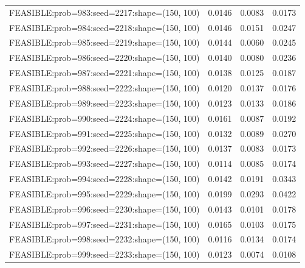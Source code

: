 \begin{longtable}{lccc}
FEASIBLE:prob=983:seed=2217:shape=(150, 100) &   0.0146 & 0.0083 & 0.0173 \\
FEASIBLE:prob=984:seed=2218:shape=(150, 100) &   0.0146 & 0.0151 & 0.0247 \\
FEASIBLE:prob=985:seed=2219:shape=(150, 100) &   0.0144 & 0.0060 & 0.0245 \\
FEASIBLE:prob=986:seed=2220:shape=(150, 100) &   0.0140 & 0.0080 & 0.0236 \\
FEASIBLE:prob=987:seed=2221:shape=(150, 100) &   0.0138 & 0.0125 & 0.0187 \\
FEASIBLE:prob=988:seed=2222:shape=(150, 100) &   0.0120 & 0.0137 & 0.0176 \\
FEASIBLE:prob=989:seed=2223:shape=(150, 100) &   0.0123 & 0.0133 & 0.0186 \\
FEASIBLE:prob=990:seed=2224:shape=(150, 100) &   0.0161 & 0.0087 & 0.0192 \\
FEASIBLE:prob=991:seed=2225:shape=(150, 100) &   0.0132 & 0.0089 & 0.0270 \\
FEASIBLE:prob=992:seed=2226:shape=(150, 100) &   0.0137 & 0.0083 & 0.0173 \\
FEASIBLE:prob=993:seed=2227:shape=(150, 100) &   0.0114 & 0.0085 & 0.0174 \\
FEASIBLE:prob=994:seed=2228:shape=(150, 100) &   0.0142 & 0.0191 & 0.0343 \\
FEASIBLE:prob=995:seed=2229:shape=(150, 100) &   0.0199 & 0.0293 & 0.0422 \\
FEASIBLE:prob=996:seed=2230:shape=(150, 100) &   0.0143 & 0.0101 & 0.0178 \\
FEASIBLE:prob=997:seed=2231:shape=(150, 100) &   0.0165 & 0.0103 & 0.0175 \\
FEASIBLE:prob=998:seed=2232:shape=(150, 100) &   0.0116 & 0.0134 & 0.0174 \\
FEASIBLE:prob=999:seed=2233:shape=(150, 100) &   0.0123 & 0.0074 & 0.0108 \\
\end{longtable}
